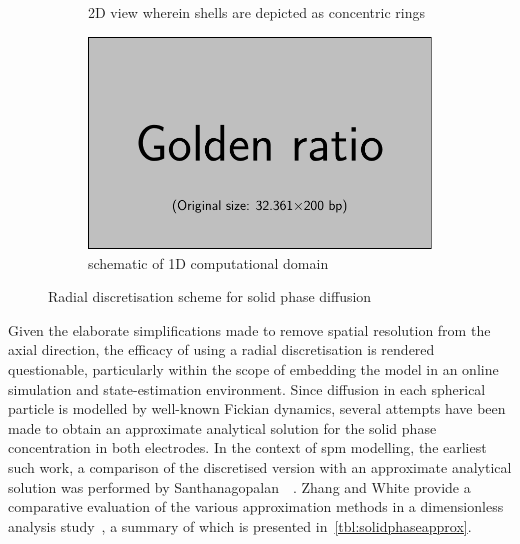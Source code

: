 \begin{figure}[h]
\begin{subfigure}[b]{0.3\textwidth}
        \caption{2D view wherein shells are depicted as concentric rings}
        \label{subfig:radialdisc2d}
    \end{subfigure}
    \hfill
    \begin{subfigure}[b]{0.3\textwidth}
        \centering
        \includegraphics[width=\textwidth]{placeholder_images/example-image-golden.pdf}
        \caption{schematic of 1D computational domain }
        \label{subfig:radialdisc1d}
    \end{subfigure}
    \caption{Radial discretisation scheme for solid phase diffusion}
    \label{fig:radialdiscretisation}
\end{figure}

Given  the elaborate  simplifications  made to  remove  spatial resolution  from
the  axial  direction,  the  efficacy   of  using  a  radial  discretisation  is
rendered  questionable, particularly  within the  scope of  embedding the  model
in  an  online  simulation  and state-estimation  environment.  Since  diffusion
in  each  spherical  particle  is   modelled  by  well-known  Fickian  dynamics,
several attempts  have been  made to obtain  an approximate  analytical solution
for  the  solid phase  concentration  in  both  electrodes.  In the  context  of
\gls{spm}  modelling,  the  earliest  such  work,  \ie{}  a  comparison  of  the
discretised  version  with  an  approximate analytical  solution  was  performed
by  Santhanagopalan~\etal~\cite{Santhanagopalan2006}.  Zhang and  White  provide
a   comparative  evaluation   of  the   various  approximation   methods  in   a
dimensionless analysis  study~\cite{Zhang2007}, a summary of  which is presented
in~\cref{tbl:solidphaseapprox}.



